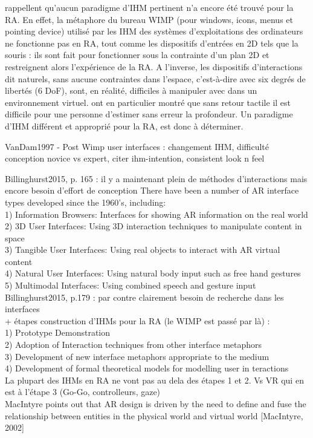 \citet{VanKrevelenPoelman2010} rappellent qu'aucun paradigme d'IHM pertinent n'a encore été trouvé pour la RA. En effet, la métaphore du bureau WIMP (pour \foreignlanguage{english}{windows}, \foreignlanguage{english}{icons}, \foreignlanguage{english}{menus} et \foreignlanguage{english}{pointing device}) utilisé par les IHM des systèmes d'exploitations des ordinateurs ne fonctionne pas en RA, tout comme les dispositifs d'entrées en 2D tels que la souris : ils sont fait pour fonctionner sous la contrainte d'un plan 2D et restreignent alors l'expérience de la RA. \citep{VanKrevelenPoelman2010} A l'inverse, les dispositifs d'interactions dit naturels, sans aucune contraintes dans l'espace, c'est-à-dire avec six degrés de libertés (6 DoF), sont, en réalité, difficiles à manipuler avec dans un environnement virtuel. \citet{ChanKaoChenEtAl2010} ont en particulier montré que sans retour tactile il est difficile pour une personne d'estimer sans erreur la profondeur. Un paradigme d'IHM différent et approprié pour la RA, est donc à déterminer.

VanDam1997 - Post Wimp user interfaces : changement IHM, difficulté conception novice vs expert, citer ihm-intention, consistent look n feel

Billinghurst2015, p. 165 : il y a maintenant plein de méthodes d'interactions mais encore besoin d'effort de conception
There have been a number of AR interface types developed since the 1960’s, including:\\
1) Information Browsers: Interfaces for showing AR information on the real world\\
2) 3D User Interfaces: Using 3D interaction techniques to manipulate content in space\\
3) Tangible User Interfaces: Using real objects to interact with AR virtual content\\
4) Natural User Interfaces: Using natural body input such as free hand gestures\\
5) Multimodal Interfaces: Using combined speech and gesture input\\

Billinghurst2015, p.179 : par contre clairement besoin de recherche dans les interfaces\\
+ étapes construction d'IHMs pour la RA (le WIMP est passé par là) :\\
1) Prototype Demonstration\\
2) Adoption of Interaction techniques from other interface metaphors\\
3) Development of new interface metaphors appropriate to the medium\\
4) Development of formal theoretical models for modelling user in teractions\\
La plupart des IHMs en RA ne vont pas au dela des étapes 1 et 2. Vs VR qui en est à l'étape 3 (Go-Go, controlleurs, gaze)\\
MacIntyre points out that AR design is driven by the need to define and fuse the relationship between entities in the physical world and virtual world [MacIntyre, 2002]

